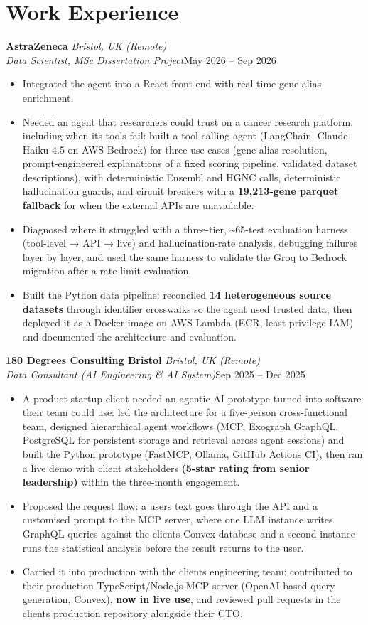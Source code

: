 \documentclass[a4paper,11pt]{article}
\newcommand{\role}[4]{%
  \textbf{#1}{\color{muted}\,\textperiodcentered\,\textit{#2}}\\
  \textit{#4}\hfill{\color{muted}#3}\par}
\newcommand{\gap}{\vspace{5pt}}
\newcommand{\num}[1]{\textbf{#1}}   %
\begin{document}
\section{Work Experience}
\role{AstraZeneca}{Bristol, UK (Remote)}{May 2026 – Sep 2026}{Data Scientist, MSc Dissertation Project}
\begin{itemize}
  \item Integrated the agent into a React front end with real-time gene alias enrichment.
  \item Needed an agent that researchers could trust on a cancer research platform, including when its tools fail: built a tool-calling agent (LangChain, Claude Haiku 4.5 on AWS Bedrock) for three use cases (gene alias resolution, prompt-engineered explanations of a fixed scoring pipeline, validated dataset descriptions), with deterministic Ensembl and HGNC calls, deterministic hallucination guards, and circuit breakers with a \num{19,213-gene parquet fallback} for when the external APIs are unavailable.
  \item Diagnosed where it struggled with a three-tier, \textasciitilde{}65-test evaluation harness (tool-level → API → live) and hallucination-rate analysis, debugging failures layer by layer, and used the same harness to validate the Groq to Bedrock migration after a rate-limit evaluation.
  \item Built the Python data pipeline: reconciled \num{14 heterogeneous source datasets} through identifier crosswalks so the agent used trusted data, then deployed it as a Docker image on AWS Lambda (ECR, least-privilege IAM) and documented the architecture and evaluation.
\end{itemize}
\gap
{}
\role{180 Degrees Consulting Bristol}{Bristol, UK (Remote)}{Sep 2025 – Dec 2025}{Data Consultant (AI Engineering \& AI System)}
\begin{itemize}
  \item A product-startup client needed an agentic AI prototype turned into software their team could use: led the architecture for a five-person cross-functional team, designed hierarchical agent workflows (MCP, Exograph GraphQL, PostgreSQL for persistent storage and retrieval across agent sessions) and built the Python prototype (FastMCP, Ollama, GitHub Actions CI), then ran a live demo with client stakeholders \num{(5-star rating from senior leadership)} within the three-month engagement.
  \item Proposed the request flow: a user\textquotesingle{}s text goes through the API and a customised prompt to the MCP server, where one LLM instance writes GraphQL queries against the client\textquotesingle{}s Convex database and a second instance runs the statistical analysis before the result returns to the user.
  \item Carried it into production with the client\textquotesingle{}s engineering team: contributed to their production TypeScript/Node.js MCP server (OpenAI-based query generation, Convex), \num{now in live use}, and reviewed pull requests in the client\textquotesingle{}s production repository alongside their CTO.
\end{itemize}
\end{document}
